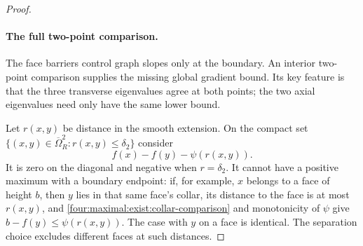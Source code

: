\begin{proof}
\paragraph{The full two-point comparison.}
The face barriers control graph slopes only at the boundary.  An interior
two-point comparison supplies the missing global gradient bound.  Its
key feature is that the three transverse eigenvalues agree at both
points; the two axial eigenvalues need only have the same lower bound.

Let $r(x,y)$ be distance in the smooth extension.  On the compact set
$\{(x,y)\in\overline\Omega_R^2:r(x,y)\le\delta_2\}$ consider
\[
 f(x)-f(y)-\psi(r(x,y)).
\]
It is zero on the diagonal and negative when $r=\delta_2$.
It cannot have a positive maximum with a boundary endpoint: if, for
example, $x$ belongs to a face of height $b$, then $y$ lies in that
same face's collar, its distance to the face is at most $r(x,y)$,
and \eqref{four:maximal:exist:collar-comparison} and monotonicity of $\psi$ give
$b-f(y)\le\psi(r(x,y))$.  The case with $y$ on a face is identical.
The separation choice excludes different faces at such distances.


\end{proof}
